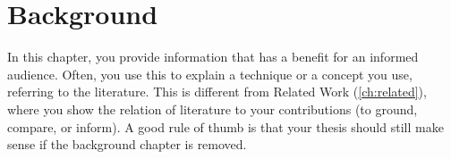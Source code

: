 \chapter{Background}%
\label{ch:background}

In this chapter, you provide information that has a benefit for an informed audience.
Often, you use this to explain a technique or a concept you use, referring to the literature.
This is different from Related Work (\cref{ch:related}), where you show the relation of literature to your contributions (to ground, compare, or inform).
A good rule of thumb is that your thesis should still make sense if the background chapter is removed.